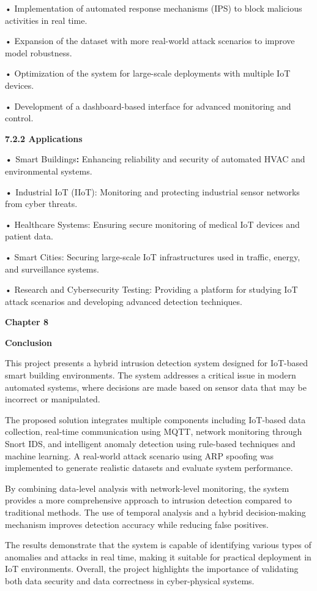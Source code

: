 • Implementation of automated response mechanisms (IPS) to block
malicious activities in real time.

• Expansion of the dataset with more real-world attack scenarios to
improve model robustness.

• Optimization of the system for large-scale deployments with multiple
IoT devices.

• Development of a dashboard-based interface for advanced monitoring and
control.

\textbf{7.2.2 Applications}

\textbf{•} Smart Buildings\textbf{:} Enhancing reliability and security
of automated HVAC and environmental systems.

\textbf{•} Industrial IoT (IIoT): Monitoring and protecting industrial
sensor networks from cyber threats.

• Healthcare Systems: Ensuring secure monitoring of medical IoT devices
and patient data.

• Smart Cities: Securing large-scale IoT infrastructures used in
traffic, energy, and surveillance systems.

• Research and Cybersecurity Testing: Providing a platform for studying
IoT attack scenarios and developing advanced detection techniques.

\textbf{Chapter 8}

\textbf{Conclusion}

This project presents a hybrid intrusion detection system designed for
IoT-based smart building environments. The system addresses a critical
issue in modern automated systems, where decisions are made based on
sensor data that may be incorrect or manipulated.

The proposed solution integrates multiple components including IoT-based
data collection, real-time communication using MQTT, network monitoring
through Snort IDS, and intelligent anomaly detection using rule-based
techniques and machine learning. A real-world attack scenario using ARP
spoofing was implemented to generate realistic datasets and evaluate
system performance.

By combining data-level analysis with network-level monitoring, the
system provides a more comprehensive approach to intrusion detection
compared to traditional methods. The use of temporal analysis and a
hybrid decision-making mechanism improves detection accuracy while
reducing false positives.

The results demonstrate that the system is capable of identifying
various types of anomalies and attacks in real time, making it suitable
for practical deployment in IoT environments. Overall, the project
highlights the importance of validating both data security and data
correctness in cyber-physical systems.

